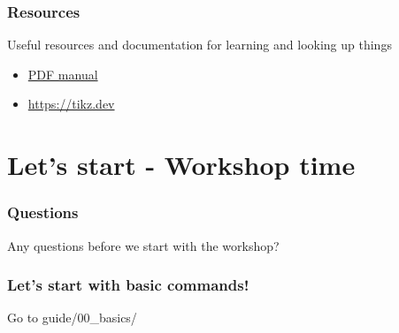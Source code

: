 \documentclass{beamer}
\begin{document}

\begin{frame}[fragile]
\frametitle{Resources}

Useful resources and documentation for learning and looking up things

%
\begin{itemize}
    \item \href{https://texdoc.org/serve/tikz/0}{PDF manual}
    \item \href{https://tikz.dev/}{https://tikz.dev}
\end{itemize}

\end{frame}
%

\section{Let's start - Workshop time}


\begin{frame}
    \frametitle{Questions}

    Any questions before we start with the workshop?

\end{frame}


\begin{frame}
    \frametitle{Let's start with basic commands!}

    Go to guide/00\_basics/

\end{frame}


\end{document}
